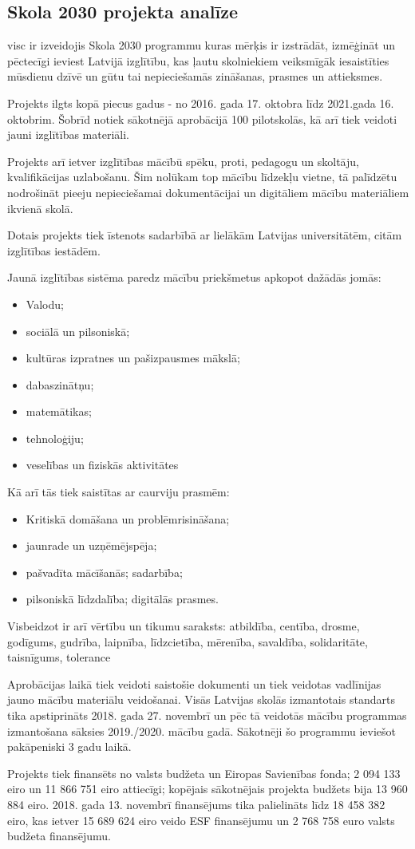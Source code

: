 \subsection{Skola 2030 projekta analīze}
\gls{visc} ir izveidojis Skola 2030 programmu kuras mērķis ir izstrādāt, izmēģināt un pēctecīgi ieviest Latvijā
izglītību, kas ļautu skolniekiem veiksmīgāk iesaistīties mūsdienu dzīvē un gūtu tai nepieciešamās zināšanas,
prasmes un attieksmes.
\par
Projekts ilgts kopā piecus gadus - no 2016. gada 17. oktobra līdz 2021.gada 16. oktobrim. Šobrīd notiek
sākotnējā aprobācijā 100 pilotskolās, kā arī tiek veidoti jauni izglītības materiāli.
\par
Projekts arī ietver izglītības mācībū spēku, proti, pedagogu un skoltāju, kvalifikācijas uzlabošanu. Šim nolūkam
top mācību līdzekļu vietne, tā palīdzētu nodrošināt pieeju nepieciešamai dokumentācijai un digitāliem mācību
materiāliem ikvienā skolā. 
\par
Dotais projekts tiek īstenots sadarbībā ar lielākām Latvijas universitātēm, citām izglītības iestādēm.
\par
Jaunā izglītības sistēma paredz mācību priekšmetus apkopot dažādās jomās:
\begin{itemize}
    \item Valodu; 
    \item sociālā un pilsoniskā;
    \item kultūras izpratnes un pašizpausmes mākslā;
    \item dabaszinātņu; 
    \item matemātikas;
    \item tehnoloģiju;
    \item veselības un fiziskās aktivitātes
\end{itemize}
Kā arī tās tiek saistītas ar caurviju prasmēm:
\begin{itemize}
    \item Kritiskā domāšana un problēmrisināšana;
    \item jaunrade un uzņēmējspēja; 
    \item pašvadīta mācīšanās; sadarbība;
    \item pilsoniskā līdzdalība; digitālās prasmes.
\end{itemize}
Visbeidzot ir arī vērtību un tikumu saraksts: atbildība, centība, drosme, godīgums, gudrība,
laipnība, līdzcietība, mērenība, savaldība, solidaritāte, taisnīgums, tolerance
\par
Aprobācijas laikā tiek veidoti saistošie dokumenti un tiek veidotas vadlīnijas jauno mācību materiālu veidošanai.
Visās Latvijas skolās izmantotais standarts tika apstiprināts 2018. gada 27. novembrī un pēc tā veidotās mācību
programmas izmantošana sāksies 2019./2020. mācību gadā. Sākotnēji šo programmu ieviešot pakāpeniski 3 gadu laikā.
\par
Projekts tiek finansēts no valsts budžeta un Eiropas Savienības fonda; 2 094 133 eiro un 11 866 751 eiro attiecīgi;
kopējais sākotnējais projekta budžets bija 13 960 884 eiro. 2018. gada 13. novembrī finansējums tika palielināts
līdz 18 458 382 eiro, kas ietver 15 689 624 eiro veido ESF finansējumu un  2 768 758 euro valsts budžeta finansējumu.     
